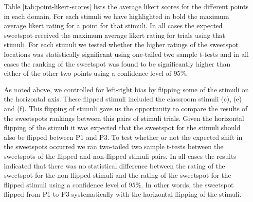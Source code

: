 \documentclass[11pt,letterpaper]{article}
\begin{document}
Table \ref{tab:point-likert-scores} lists the average likert scores for the different points in each domain. For each stimuli we have highlighted in bold the maximum average likert rating for a point for that stimuli. In all cases the expected sweetspot received the maximum average likert rating for trials using that stimuli. For each stimuli we tested whether the higher ratings of the sweetspot locations was statistically significant using one-tailed two sample t-tests and in all cases the ranking of the sweetspot was found to be significantly higher than either of the other two points using a confidence level of $95\%$. 

As noted above, we controlled for left-right bias by flipping some of the stimuli on the horizontal axis. These flipped stimuli included the classroom stimuli (c), (e) and (f). This flipping of stimuli gave us the opportunity to compare the results of the sweetspots rankings between this pairs of stimuli trials. Given the horizontal flipping of the stimuli it was expected that the sweetspot for the stimuli should also be flipped between P1 and P3. To test whether or not the expected shift in the sweetspots occurred we ran two-tailed two sample t-tests between the sweetspots of the flipped and non-flipped stimuli pairs. In all cases the results indicated that there was no statistical difference between the rating of the sweetspot for the non-flipped stimuli and the rating of the sweetspot for the flipped stimuli using a confidence level of $95\%$. In other words, the sweetspot flipped from P1 to P3 systematically with the horizontal flipping of the stimuli. 
\end{document}
